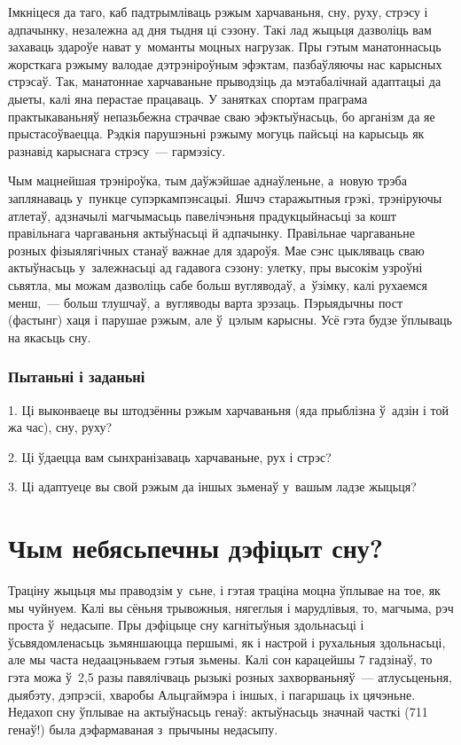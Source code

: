 Імкніцеся да таго, каб падтрымліваць рэжым харчаваньня, сну, руху, стрэсу і адпачынку, незалежна ад дня тыдня ці сэзону. Такі лад жыцьця дазволіць вам захаваць здароўе нават у~моманты моцных нагрузак. Пры гэтым манатоннасьць жорсткага рэжыму валодае дэтрэніроўным эфэктам, пазбаўляючы нас карысных стрэсаў. Так, манатоннае харчаваньне прыводзіць да мэтабалічнай адаптацыі да дыеты, калі яна перастае працаваць. У занятках спортам праграма практыкаваньняў непазьбежна страчвае сваю эфэктыўнасьць, бо арганізм да яе прыстасоўваецца. Рэдкія парушэньні рэжыму могуць пайсьці на карысьць як разнавід карыснага стрэсу~--- гармэзісу.

Чым мацнейшая трэніроўка, тым даўжэйшае аднаўленьне, а~новую трэба заплянаваць у~пункце супэркампэнсацыі. Яшчэ старажытныя грэкі, трэніруючы атлетаў, адзначылі магчымасьць павелічэньня прадукцыйнасьці за кошт правільнага чаргаваньня актыўнасьці й адпачынку. Правільнае чаргаваньне розных фізыялягічных станаў важнае для здароўя. Мае сэнс цыкляваць сваю актыўнасьць у~залежнасьці ад гадавога сэзону: улетку, пры высокім узроўні сьвятла, мы можам дазволіць сабе больш вугляводаў, а~ўзімку, калі рухаемся менш,~--- больш тлушчаў, а~вугляводы варта зрэзаць. Пэрыядычны пост (фастынг) хаця і парушае рэжым, але ў~цэлым карысны. Усё гэта будзе ўплываць на якасьць сну.

\subsubsection{Пытаньні і заданьні}

1. Ці выконваеце вы штодзённы рэжым харчаваньня (яда прыблізна ў~адзін і той жа час), сну, руху?

2. Ці ўдаецца вам сынхранізаваць харчаваньне, рух і стрэс?

3. Ці адаптуеце вы свой рэжым да іншых зьменаў у~вашым ладзе жыцьця?


\section{Чым небясьпечны дэфіцыт сну?}

Траціну жыцьця мы праводзім у~сьне, і гэтая траціна моцна ўплывае на тое, як мы чуйнуем. Калі вы сёньня трывожныя, нягеглыя і марудлівыя, то, магчыма, рэч проста ў~недасыпе. Пры дэфіцыце сну кагнітыўныя здольнасьці і ўсьвядомленасьць зьмяншаюцца першымі, як і настрой і рухальныя здольнасьці, але мы часта недаацэньваем гэтыя зьмены. Калі сон карацейшы 7 гадзінаў, то гэта можа ў~2,5 разы павялічваць рызыкі розных захворваньняў~--- атлусьценьня, дыябэту, дэпрэсіі, хваробы Альцгаймэра і іншых, і пагаршаць іх цячэньне. Недахоп сну ўплывае на актыўнасьць генаў: актыўнасьць значнай часткі (711 генаў!) была дэфармаваная з~прычыны недасыпу.

